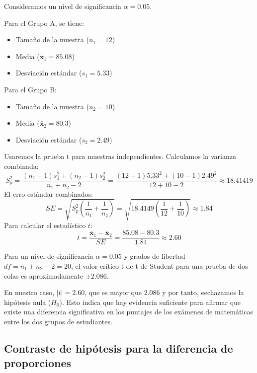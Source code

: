 \documentclass[
  letterpaper,
  DIV=11,
  numbers=noendperiod]{scrreprt}
\providecommand{\tightlist}{%
  \setlength{\itemsep}{0pt}\setlength{\parskip}{0pt}}\usepackage{longtable,booktabs,array}
\begin{document}
\begin{tcolorbox}
Consideramos un nivel de significancia \(\alpha=0.05\).

Para el Grupo A, se tiene:

\begin{itemize}
\tightlist
\item
  Tamaño de la muestra (\(n_1= 12\))
\item
  Media (\(\bar{\mathbf{x}}_1 = 85.08\))
\item
  Desviación estándar (\(s_1=5.33\))
\end{itemize}

Para el Grupo B:

\begin{itemize}
\tightlist
\item
  Tamaño de la muestra (\(n_2= 10\))
\item
  Media (\(\bar{\mathbf{x}}_2 = 80.3\))
\item
  Desviación estándar (\(s_2=2.49\))
\end{itemize}

Usaremos la prueba t para muestras independientes. Calculamos la
varianza combinada: \[
S^2_p=  \frac{(n_1 - 1)s_1^2 + (n_2 - 1)s_2^2}{n_1 + n_2 - 2}=\frac{(12-1)5.33^2 + (10-1)2.49^2}{12+10-2} \approx 18.41419
\] El erro estándar combinados: \[
SE = \sqrt{S^2_p \left( \frac{1}{n₁} + \frac{1}{n₂} \right)}= \sqrt{18.4149 \left( \frac{1}{12} + \frac{1}{10} \right)}\approx 1.84
\] Para calcular el estadístico \(t\): \[ 
t = \frac{\bar{\mathbf{x}}_1-\bar{\mathbf{x}}_2}{SE}=\frac{85.08-80.3}{1.84}\approx2.60
\]

Para un nivel de significancia \(\alpha= 0.05\) y grados de libertad
\(df = n_1+n_2- 2 = 20\), el valor crítico t de t de Student para una
prueba de dos colas es aproximadamente \(\pm2.086\).

En nuestro caso, \(|t| = 2.60\), que es mayor que \(2.086\) y por tanto,
eechazamos la hipótesis nula (\(H_0\)). Esto indica que hay evidencia
suficiente para afirmar que existe una diferencia significativa en los
puntajes de los exámenes de matemáticas entre los dos grupos de
estudiantes.

\end{tcolorbox}

\hypertarget{contraste-de-hipuxf3tesis-para-la-diferencia-de-proporciones}{%
\subsection{Contraste de hipótesis para la diferencia de
proporciones}\label{contraste-de-hipuxf3tesis-para-la-diferencia-de-proporciones}}
\end{document}
